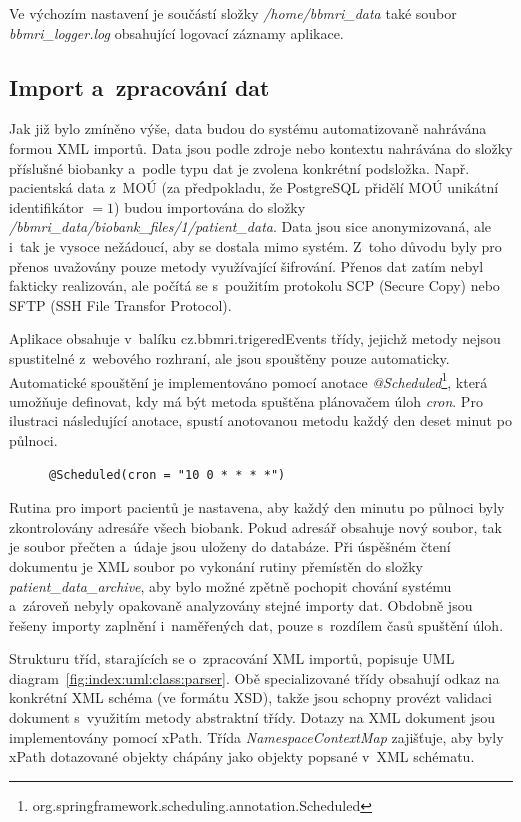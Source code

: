 \documentclass[11pt, draft, oneside]{fithesis2}
\begin{document}
Ve výchozím nastavení je součástí složky \textit{/home/bbmri\_data} také soubor \textit{bbmri\_logger.log} obsahující logovací záznamy aplikace. 

\subsection{Import a~zpracování dat}\label{chapter:implementation:subsection:import}
Jak již bylo zmíněno výše, data budou do systému automatizovaně nahrávána formou XML importů. Data jsou podle zdroje nebo kontextu nahrávána do složky příslušné biobanky a~podle typu dat je zvolena konkrétní podsložka. Např. pacientská data z~MOÚ (za předpokladu, že PostgreSQL přidělí MOÚ unikátní identifikátor $= 1$) budou importována do složky \textit{/bbmri\_data/biobank\_files/1/patient\_data}. Data jsou sice anonymizovaná, ale i~tak je vysoce nežádoucí, aby se dostala mimo systém. Z~toho důvodu byly pro přenos uvažovány pouze metody využívající šifrování. Přenos dat zatím nebyl fakticky realizován, ale počítá se s~použitím protokolu SCP (Secure Copy) nebo SFTP (SSH File Transfor Protocol). 

Aplikace obsahuje v~balíku cz.bbmri.trigeredEvents třídy, jejichž metody nejsou spustitelné z~webového rozhraní, ale jsou spouštěny pouze automaticky. Automatické spouštění je implementováno pomocí anotace \textit{@Scheduled}\footnote{org.springframework.scheduling.annotation.Scheduled}, která umožňuje definovat, kdy má být metoda spuštěna plánovačem úloh \textit{cron}. 
Pro ilustraci následující anotace, spustí anotovanou metodu každý den deset minut po půlnoci. 
\begin{figure}[h!]
\centering
\begin{BVerbatim}
@Scheduled(cron = "10 0 * * * *")
\end{BVerbatim}
\end{figure}
Rutina pro import pacientů je nastavena, aby každý den minutu po půlnoci byly zkontrolovány adresáře všech biobank. Pokud adresář obsahuje nový soubor, tak je soubor přečten a~údaje jsou uloženy do databáze. Při úspěšném čtení dokumentu je XML soubor po vykonání rutiny přemístěn do složky \textit{patient\_data\_archive}, aby bylo možné zpětně pochopit chování systému a~zároveň nebyly opakovaně analyzovány stejné importy dat.
Obdobně jsou řešeny importy zaplnění i~naměřených dat, pouze s~rozdílem časů spuštění úloh.

Strukturu tříd, starajících se o~zpracování XML importů, popisuje UML diagram~\ref{fig:index:uml:class:parser}. Obě specializované třídy obsahují odkaz na konkrétní XML schéma (ve formátu XSD), takže jsou schopny provézt validaci dokument s~využitím metody abstraktní třídy. Dotazy na XML dokument jsou implementovány pomocí xPath.
Třída \textit{NamespaceContextMap} zajišťuje, aby byly xPath dotazované objekty chápány jako objekty popsané v~XML schématu.
\end{document}
